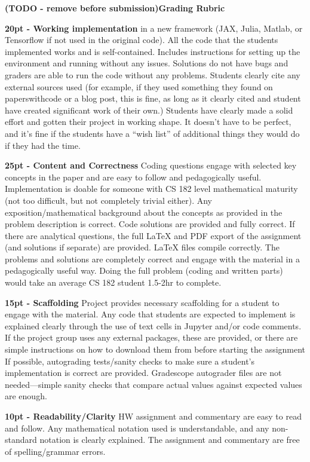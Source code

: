 \textbf{(TODO - remove before submission)Grading Rubric}

\textbf{20pt - Working implementation} in a new framework (JAX, Julia, Matlab, or Tensorflow if not used in the original code).
All the code that the students implemented works and is self-contained. Includes instructions for setting up the environment and running without any issues. Solutions do not have bugs and graders are able to run the code without any problems.
Students clearly cite any external sources used (for example, if they used something they found on paperswithcode or a blog post, this is fine, as long as it clearly cited and student have created significant work of their own.) 
Students have clearly made a solid effort and gotten their project in working shape. It doesn’t have to be perfect, and it’s fine if the students have a “wish list” of additional things they would do if they had the time.

\textbf{25pt - Content and Correctness}
Coding questions engage with selected key concepts in the paper and are easy to follow and pedagogically useful. Implementation is doable for someone with CS 182 level mathematical maturity (not too difficult, but not completely trivial either).
Any exposition/mathematical background about the concepts as provided in the problem description is correct. 
Code solutions are provided and fully correct. 
If there are analytical questions, the full LaTeX and PDF export of the assignment (and solutions if separate) are provided. LaTeX files compile correctly. The problems and solutions are completely correct and engage with the material in a pedagogically useful way.
Doing the full problem (coding and written parts) would take an average CS 182 student 1.5-2hr to complete. 


\textbf{15pt - Scaffolding}
Project provides necessary scaffolding for a student to engage with the material. Any code that students are expected to implement is explained clearly through the use of text cells in Jupyter and/or code comments.
If the project group uses any external packages, these are provided, or there are simple instructions on how to download them from before starting the assignment
If possible, autograding tests/sanity checks to make sure a student’s implementation is correct are provided. Gradescope autograder files are not needed—simple sanity checks that compare actual values against expected values are enough. 

\textbf{10pt - Readability/Clarity}
HW assignment and commentary are easy to read and follow. Any mathematical notation used is understandable, and any non-standard notation is clearly explained. The assignment and commentary are free of spelling/grammar errors.

